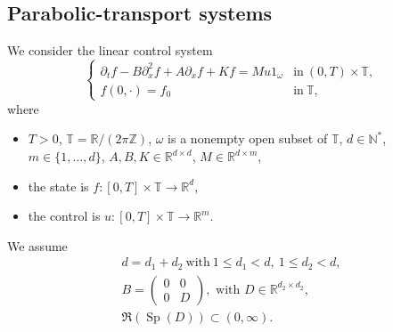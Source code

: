 \documentclass[JEP,XML,SOM,Unicode,NoEqCountersInSection]{cedram}
\theoremstyle{plain}
\theoremstyle{definition}
\theoremstyle{remark}
\DeclareMathOperator{\Sp}{Sp}
\newcommand{\set}{\mathbb}
\newcommand{\N}{\set{N}}
\newcommand{\Z}{\set{Z}}
\newcommand{\R}{} %
\renewcommand{\R}{\set{R}}
\newcommand{\T}{\set{T}}
\begin{document}
\subsection{Parabolic-transport systems}
We consider the linear control system
\begin{equation}
\label{Syst}\tag{Sys}
\begin{cases}
\partial_t f- B \partial_{x}^2 f + A \partial_x f + K f = M u 1_{\omega} &\text{in}\ (0,T)\times \T,\\
f(0,\cdot)=f_0& \text{in}\ \T,
\end{cases}
\end{equation}
where
\begin{itemize}
\item $T >0$, $\T = \R/(2\pi \Z)$, $\omega$ is a nonempty open subset of $\T$, $d \in \N^{*}$, $m\in\{1,\dots,d\}$, $A, B, K \in \R^{d \times d}$, $M\in\R^{d\times m}$,
\item the state is $f\colon [0,T]\times\T \to \R^d$,
\item the control is $u\colon [0,T]\times\T \to \R^m$.
\end{itemize}
We assume
\begin{gather}
d=d_1 + d_2\ \text{with}\ 1 \leq d_1 < d,\ 1 \leq d_2 < d,\label{dd1d2}\tag{H.1}\\
B = \begin{pmatrix}0&0\\0&D\end{pmatrix},\text{ with } D\in \set R^{d_2\times d_2},\label{h:B}\tag{H.2}\\
\Re(\Sp(D)) \subset (0,\infty). \label{h:D}\tag{H.3}
\end{gather}
\end{document}
